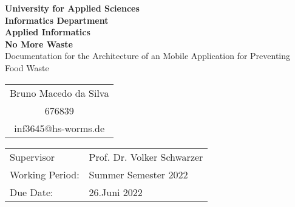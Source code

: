 \begin{titlepage}
    \vspace*{2mm}
    \begin{center}
        \Large
        \textbf{University for Applied Sciences}\\
        \textbf{Informatics Department}\\
        \textbf{Applied Informatics}\\
        \vspace{2cm}
        \textbf{No More Waste}\\
        \vspace{2cm}
        \large
        Documentation for the Architecture of an Mobile Application for Preventing Food Waste\\
        \vspace{4cm}
        \begin {table}[ht]
            \centering
            \begin{tabular}{c}
                Bruno Macedo da Silva    \\ 
                676839                   \\
                inf3645@hs-worms.de      \\
            \end{tabular}
        \end {table}
        \vspace{2cm}
        \large
        \vspace{2cm}
         \begin {table}[ht]
             \centering
             \begin{tabular}{l l}
                Supervisor         & Prof. Dr. Volker Schwarzer \\
                Working Period:    & Summer Semester 2022 \\
                Due Date:          & 26.Juni 2022 \\
             \end{tabular}
         \end {table}
    \end{center}
    \normalsize
    \vfill
 


\end{titlepage}